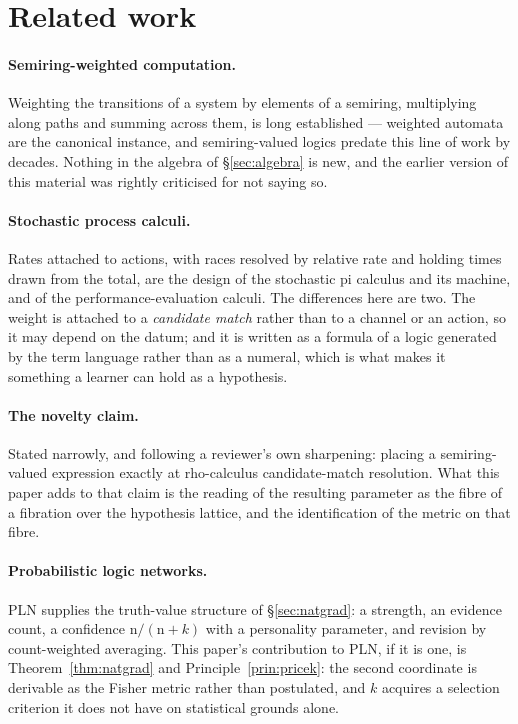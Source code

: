\documentclass[11pt,a4paper]{article}
\theoremstyle{plain}
\theoremstyle{definition}
\theoremstyle{remark}
\newcommand{\rhoc}{\textsf{rho}}
\newcommand{\ev}{\mathrm{n}}
\begin{document}
\section{Related work}\label{sec:related}

\paragraph{Semiring-weighted computation.} Weighting the transitions of a system
by elements of a semiring, multiplying along paths and summing across them, is
long established --- weighted automata are the canonical instance, and
semiring-valued logics predate this line of work by decades. Nothing in the
algebra of \S\ref{sec:algebra} is new, and the earlier version of this material
was rightly criticised for not saying so.

\paragraph{Stochastic process calculi.} Rates attached to actions, with races
resolved by relative rate and holding times drawn from the total, are the design
of the stochastic pi calculus and its machine, and of the performance-evaluation
calculi. The differences here are two. The weight is attached to a
\emph{candidate match} rather than to a channel or an action, so it may depend on
the datum; and it is written as a formula of a logic generated by the term
language rather than as a numeral, which is what makes it something a learner can
hold as a hypothesis.

\paragraph{The novelty claim.} Stated narrowly, and following a reviewer's own
sharpening: placing a semiring-valued expression exactly at \rhoc{}-calculus
candidate-match resolution. What this paper adds to that claim is the reading of
the resulting parameter as the fibre of a fibration over the hypothesis lattice,
and the identification of the metric on that fibre.

\paragraph{Probabilistic logic networks.} PLN supplies the truth-value structure
of \S\ref{sec:natgrad}: a strength, an evidence count, a confidence
$\ev/(\ev+k)$ with a personality parameter, and revision by count-weighted
averaging. This paper's contribution to PLN, if it is one, is
Theorem~\ref{thm:natgrad} and Principle~\ref{prin:pricek}: the second coordinate
is derivable as the Fisher metric rather than postulated, and $k$ acquires a
selection criterion it does not have on statistical grounds alone.
\end{document}
